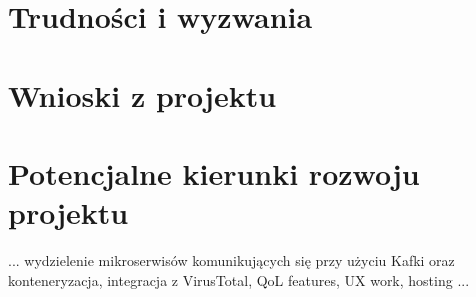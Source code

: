 \documentclass[a4paper,twoside,12pt]{book}
\begin{document}
\section{Trudności i wyzwania}

\section{Wnioski z projektu}

\section{Potencjalne kierunki rozwoju projektu}
...
wydzielenie mikroserwisów komunikujących się przy użyciu Kafki oraz konteneryzacja, integracja z VirusTotal, QoL features, UX work, hosting
...

\cleardoublepage
{}
{}
\printbibliography
\end{document}
